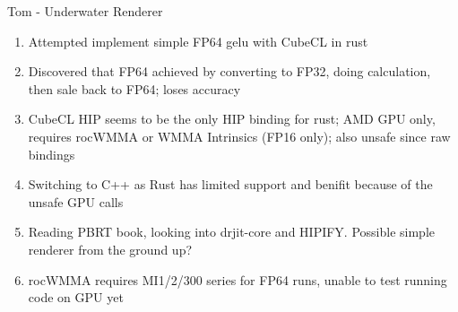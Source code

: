 \begin{frame}{Tom - Underwater Renderer}
    \begin{enumerate}
      \item Attempted implement simple FP64 gelu with CubeCL in rust
      \item Discovered that FP64 achieved by converting to FP32, doing calculation, then sale back to FP64; loses accuracy
      \item CubeCL HIP seems to be the only HIP binding for rust; AMD GPU only, requires rocWMMA or WMMA Intrinsics (FP16 only); also unsafe since raw bindings
      \item Switching to C++ as Rust has limited support and benifit because of the unsafe GPU calls
      \item Reading PBRT book, looking into drjit-core and HIPIFY. Possible simple renderer from the ground up?
      \item rocWMMA requires MI1/2/300 series for FP64 runs, unable to test running code on GPU yet
    \end{enumerate}
\end{frame}
